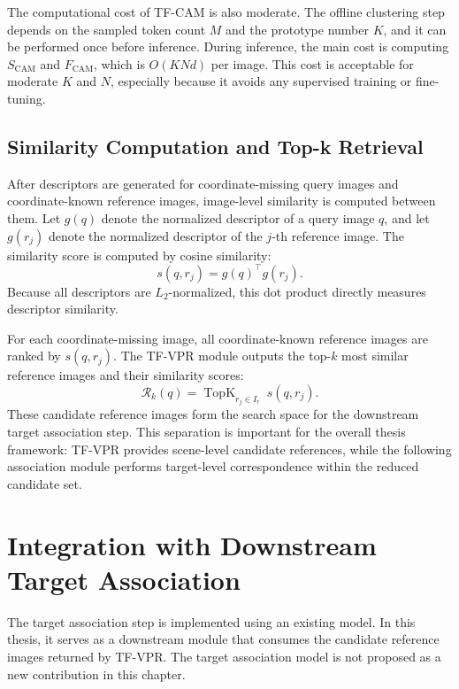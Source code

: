 The computational cost of TF-CAM is also moderate. The offline clustering step depends on the sampled token count \(M\) and the prototype number \(K\), and it can be performed once before inference. During inference, the main cost is computing \(S_{\mathrm{CAM}}\) and \(F_{\mathrm{CAM}}\), which is \(O(KNd)\) per image. This cost is acceptable for moderate \(K\) and \(N\), especially because it avoids any supervised training or fine-tuning.

\subsection{Similarity Computation and Top-k Retrieval}
After descriptors are generated for coordinate-missing query images and coordinate-known reference images, image-level similarity is computed between them. Let \(g(q)\) denote the normalized descriptor of a query image \(q\), and let \(g(r_j)\) denote the normalized descriptor of the \(j\)-th reference image. The similarity score is computed by cosine similarity:
\begin{equation}
  s(q,r_j) = g(q)^{\top}g(r_j).
\end{equation}
Because all descriptors are \(L_2\)-normalized, this dot product directly measures descriptor similarity.

For each coordinate-missing image, all coordinate-known reference images are ranked by \(s(q,r_j)\). The TF-VPR module outputs the top-\(k\) most similar reference images and their similarity scores:
\begin{equation}
  \mathcal{R}_k(q)=
  \operatorname{TopK}_{r_j \in I_r}\ s(q,r_j).
\end{equation}
These candidate reference images form the search space for the downstream target association step. This separation is important for the overall thesis framework: TF-VPR provides scene-level candidate references, while the following association module performs target-level correspondence within the reduced candidate set.

\section{Integration with Downstream Target Association}
The target association step is implemented using an existing model. In this thesis, it serves as a downstream module that consumes the candidate reference images returned by TF-VPR. The target association model is not proposed as a new contribution in this chapter.


